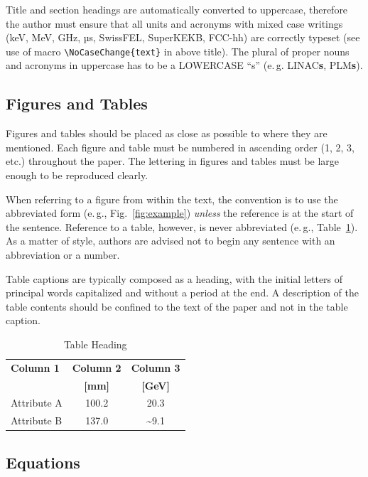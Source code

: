 \documentclass[%
               ]{jacow}
\begin{document}
Title and section headings are automatically converted to uppercase, therefore the author must ensure 
that all units and acronyms with mixed case writings (keV, MeV, GHz, µs, SwissFEL, SuperKEKB, 
FCC-hh) are correctly typeset (see use of macro \verb|\NoCaseChange{text}| in above title).
The plural of proper nouns and acronyms in uppercase has to be a LOWERCASE “s” (e.\,g. 
LINAC\textbf{s}, PLM\textbf{s}). 

\subsection{Figures and Tables}

Figures and tables should be placed as close as possible to where they are mentioned. 
Each figure and table must be numbered in ascending order (1, 2, 3, etc.) throughout the paper. 
The lettering in figures and tables must be large enough to be reproduced clearly. 

When referring to a figure from within the text, the
convention is to use the abbreviated form (e.\,g., Fig.~\ref{fig:example})
\emph{unless} the reference is at the start of the sentence. Reference to a
table, however, is never abbreviated (e.\,g., Table~\ref{tab:example}).
As a matter of style, authors are advised not to begin any sentence with an abbreviation or a number.

Table captions are typically composed as a heading, with the initial letters of principal words capitalized and without a period at the end. A description of the table contents should be confined to the text of the paper and not in the table caption. 
\begin{table}[!hbt]
   \centering
   \caption{Table Heading}
   \begin{tabular}{lcc}
       \toprule
       \textbf{Column 1} & \textbf{Column 2} & \textbf{Column 3} \\ 
                         & \textbf{[mm]}     & \textbf{[GeV]}	 \\
       \midrule
          Attribute A    & \num{100.2}       & \num{20.3}        \\
          Attribute B    & \num{137.0}       & \num{~9.1}        \\
       \bottomrule
   \end{tabular}
   \label{tab:example}
\end{table}

\subsection{Equations}
\end{document}
